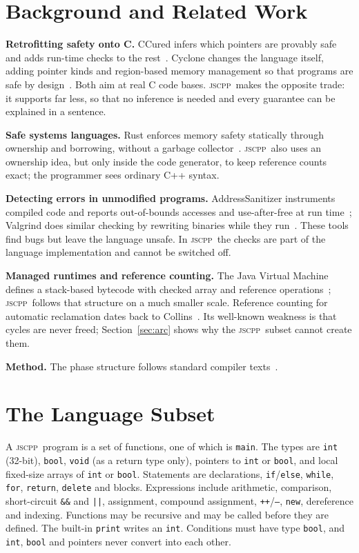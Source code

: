 \documentclass[conference]{IEEEtran}
\newcommand{\jscpp}{\textsc{jscpp}}
\begin{document}
\section{Background and Related Work}
\label{sec:related}
\textbf{Retrofitting safety onto C.} CCured infers which pointers are provably safe and adds run-time checks to
the rest~\cite{necula2002}. Cyclone changes the language itself, adding pointer kinds and region-based memory
management so that programs are safe by design~\cite{jim2002}. Both aim at real C code bases. \jscpp\ makes the
opposite trade: it supports far less, so that no inference is needed and every guarantee can be explained in a
sentence.

\textbf{Safe systems languages.} Rust enforces memory safety statically through ownership and borrowing, without a
garbage collector~\cite{matsakis2014}. \jscpp\ also uses an ownership idea, but only inside the code generator, to
keep reference counts exact; the programmer sees ordinary C++ syntax.

\textbf{Detecting errors in unmodified programs.} AddressSanitizer instruments compiled code and reports
out-of-bounds accesses and use-after-free at run time~\cite{serebryany2012}; Valgrind does similar checking by
rewriting binaries while they run~\cite{nethercote2007}. These tools find bugs but leave the language unsafe. In
\jscpp\ the checks are part of the language implementation and cannot be switched off.

\textbf{Managed runtimes and reference counting.} The Java Virtual Machine defines a stack-based bytecode with
checked array and reference operations~\cite{lindholm2021}; \jscpp\ follows that structure on a much smaller
scale. Reference counting for automatic reclamation dates back to Collins~\cite{collins1960}. Its well-known
weakness is that cycles are never freed; Section~\ref{sec:arc} shows why the \jscpp\ subset cannot create them.

\textbf{Method.} The phase structure follows standard compiler texts~\cite{aho2006,nystrom2021}.

\section{The Language Subset}
\label{sec:language}
A \jscpp\ program is a set of functions, one of which is \texttt{main}. The types are \texttt{int} (32-bit),
\texttt{bool}, \texttt{void} (as a return type only), pointers to \texttt{int} or \texttt{bool}, and local
fixed-size arrays of \texttt{int} or \texttt{bool}. Statements are declarations, \texttt{if}/\texttt{else},
\texttt{while}, \texttt{for}, \texttt{return}, \texttt{delete} and blocks. Expressions include arithmetic,
comparison, short-circuit \texttt{\&\&} and \texttt{||}, assignment, compound assignment, \texttt{++}/\texttt{--},
\texttt{new}, dereference and indexing. Functions may be recursive and may be called before they are defined.
The built-in \texttt{print} writes an \texttt{int}. Conditions must have type \texttt{bool}, and \texttt{int},
\texttt{bool} and pointers never convert into each other.
\end{document}
